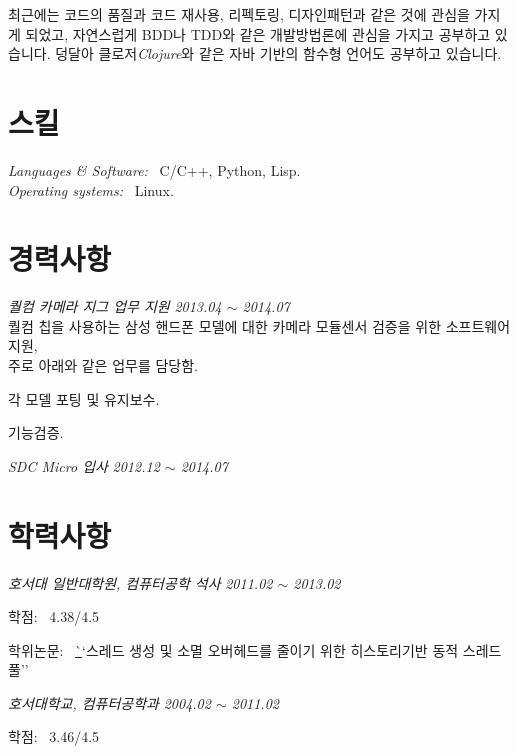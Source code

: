\documentclass[line,margin]{res}
\begin{document}
\begin{resume}
  최근에는 코드의 품질과 코드 재사용, 리펙토링, 디자인패턴과 같은 것에 관심을 가지게 되었고,
  자연스럽게 BDD나 TDD와 같은 개발방법론에 관심을 가지고 공부하고 있습니다.
  덩달아 클로저{\footnotesize {\sl Clojure}}와 같은 자바 기반의 함수형 언어도 공부하고 있습니다.


  \section{스킬}

  {\sl Languages \& Software:} ~C/C++, Python, Lisp. \\
  {\sl Operating systems:} ~Linux.


  \section{경력사항}

  {\sl 퀄컴 카메라 지그 업무 지원} \hfill {\sl 2013.04 $\sim$ 2014.07} \vspace{1mm} \\
  {\small
    퀄컴 칩을 사용하는 삼성 핸드폰 모델에 대한 카메라 모듈센서 검증을 위한 소프트웨어 지원, \\
    주로 아래와 같은 업무를 담당함.}
  \vspace{1mm}
  \begin{itemize}
    {\small
    \item[-] 각 모델 포팅 및 유지보수. \vspace{-1mm}
    \item[-] 기능검증.}
  \end{itemize}

  {\sl SDC Micro 입사} \hfill {\sl 2012.12 $\sim$ 2014.07} \vspace{0mm}


  \section{학력사항}

  {\sl 호서대 일반대학원, 컴퓨터공학 석사} \hfill {\sl 2011.02 $\sim$ 2013.02} \vspace{1mm}
  \begin{itemize}
    {\small
    \item[-] 학점: ~4.38/4.5 \vspace{-1mm}
    \item[-] 학위논문: ~\href{http://dlibrary.hoseo.ac.kr/search/DetailView.ax?sid=4&cid=950591}
                     ``스레드 생성 및 소멸 오버헤드를 줄이기 위한 히스토리기반 동적 스레드 풀''}
  \end{itemize}

  {\sl 호서대학교, 컴퓨터공학과} \hfill {\sl 2004.02 $\sim$ 2011.02} \vspace{1mm}
  \begin{itemize}
    {\small
    \item[-] 학점: ~3.46/4.5}
  \end{itemize}


\end{resume}

\end{document}
